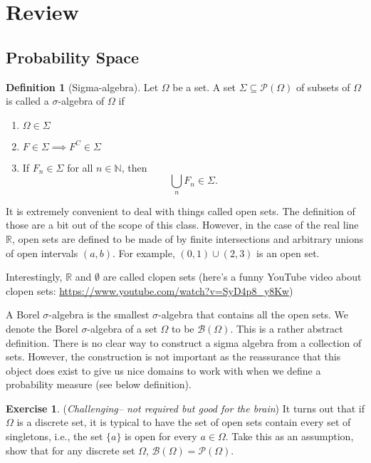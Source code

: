 \documentclass[
  openany]{book}
\theoremstyle{definition}
\newtheorem{definition}{Definition}[chapter]
\theoremstyle{definition}
\theoremstyle{definition}
\newtheorem{exercise}{Exercise}[chapter]
\theoremstyle{definition}
\theoremstyle{remark}
\begin{document}
\hypertarget{review}{%
\section{Review}\label{review}}

\hypertarget{probability-space}{%
\subsection{Probability Space}\label{probability-space}}

\begin{definition}[Sigma-algebra]

Let \(\Omega\) be a set.
A set \(\Sigma \subseteq \mathcal{P}(\Omega)\) of subsets of \(\Omega\) is called a \(\sigma\)-algebra
of \(\Omega\) if

\begin{enumerate}
\def\labelenumi{\arabic{enumi}.}
\item
  \(\Omega\in \Sigma\)
\item
  \(F \in \Sigma \implies F^C \in \Sigma\)
\item
  If \(F_n \in \Sigma\) for all \(n\in \mathbb{N}\), then
  \[ \bigcup_n F_n \in \Sigma .\]
\end{enumerate}

\end{definition}

It is extremely convenient to deal with things called open sets.
The definition of those are a bit out of the scope of this class.
However,
in the case of the real line \(\mathbb{R}\), open sets are defined to be made of by finite intersections and arbitrary unions of open intervals \((a,b)\).
For example, \((0,1)\cup (2,3)\) is an open set.

Interestingly, \(\mathbb{R}\) and \(\emptyset\) are called clopen sets (here's a funny YouTube video about clopen sets: \url{https://www.youtube.com/watch?v=SyD4p8_y8Kw})

A Borel \(\sigma\)-algebra is the smallest \(\sigma\)-algebra that contains all the open sets.
We denote the Borel \(\sigma\)-algebra of a set \(\Omega\) to be \(\mathcal{B}(\Omega)\).
This is a rather abstract definition. There is no clear way to construct a sigma algebra from a collection of sets. However, the construction is not important as the reassurance that this object does exist to give us nice domains to work with when we define a probability measure (see below definition).

\begin{exercise}
(\emph{Challenging-- not required but good for the brain})
It turns out that if \(\Omega\) is a discrete set, it is typical to have the set of open sets contain every set of singletons, i.e.,
the set \(\{ a \}\) is open for every \(a\in \Omega\).
Take this as an assumption, show that
for any discrete set \(\Omega\), \(\mathcal{B}(\Omega) = \mathcal{P}(\Omega)\).
\end{exercise}
\end{document}
